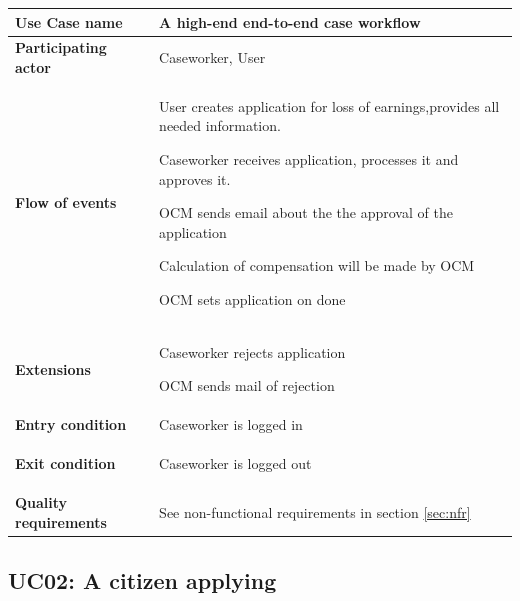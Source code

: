 \begin{table}[htb!]
\begin{tabularx}{\textwidth}{l|X}
	\textbf{Use Case name} & A high-end end-to-end case workflow \\
	\hline
	\textbf{Participating actor} & Caseworker, User\\
	\hline
	\textbf{Flow of events} &
	\begin{compactenum}
			\item User creates application for loss of earnings,provides all needed information.
			\item Caseworker receives application, processes it and approves it.
			\item OCM sends email about the the approval of the application
			\item Calculation of compensation will be made by OCM
			\item OCM sets application on done
	\end{compactenum}\\
	\hline
	\textbf{Extensions} & 
	    \begin{compactenum}
	        \setcounter{enumi}{1}
	        \item \begin{compactenum}
	            \item Caseworker rejects application
	            \item OCM sends mail of rejection
	        \end{compactenum}
	    \end{compactenum}\\
	\hline
	\textbf{Entry condition} &
	Caseworker is logged in
	\\
	\hline
	\textbf{Exit condition} & 
	\begin{compactenum}
	    \item Caseworker is logged out
	\end{compactenum}
	\\
	\hline
	\textbf{Quality requirements} & See non-functional requirements in section \ref{sec:nfr}\\
\end{tabularx}
\end{table}

\subsection{UC02: A citizen applying}

